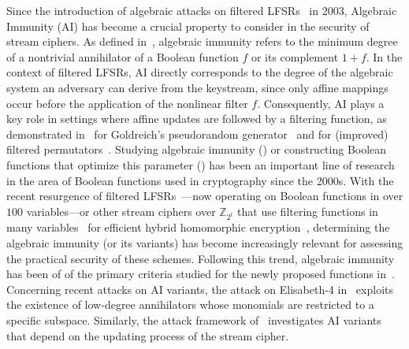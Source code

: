 \documentclass[11pt]{llncs}
\begin{document}
Since the introduction of algebraic attacks on filtered LFSRs~\cite{EC:CouMei03} in 2003, Algebraic Immunity (AI) has become a crucial property to consider in the security of stream ciphers. 
As defined in~\cite{EC:MeiPasCar04}, algebraic immunity refers to the minimum degree of a nontrivial annihilator of a Boolean function $f$ or its complement $1+f$. 
In the context of filtered LFSRs, AI directly corresponds to the degree of the algebraic system an adversary can derive from the keystream, since only affine mappings occur before the application of the nonlinear filter $f$. 
Consequently, AI plays a key role in settings where affine updates are followed by a filtering function, as demonstrated in~\cite{SIAM:AppLov18} for Goldreich's pseudorandom generator~\cite{Goldreich00} and for (improved) filtered permutators~\cite{EC:MJSC16,INDO:MCJS19}. 
Studying algebraic immunity (\eg \cite{IEEE:Didier06,AMC:CarMer13,DAM:Meaux22}) or constructing Boolean functions that optimize this parameter (\eg \cite{INDOCRYPT:DalGupMai04,DCC:DalMaiSar06,ISIT:Carlet07,LiQi07,AC:CarFen08,IEEE:QFLW09,IEEE:CheLu11,IEEE:ZCSH11,DCC:TuDen11,
AC:LiuZhaLin12,IEEE:TanCarTan13,CC:LimKolKal13,DCC:LCZLHS14,IEEE:LiuLin14,TanLuoDu16,IEEE:TCTZ17, DCC:LimKol18,CC:TangLiu19}) has been an important line of research in the area of Boolean functions used in cryptography since the 2000s. 
With the recent resurgence of filtered LFSRs~\cite{eprint:nostalgia,eprint:CarSar25}—now operating on Boolean functions in over $100$ variables—or other stream ciphers over $\mathbb{Z}_{2^t}$ that use filtering functions in many variables~\cite{AC:CHMS22,Indo:HofMeaSta23} for efficient hybrid homomorphic encryption~\cite{EPRINT:LauNaeVai11}, determining the algebraic immunity (or its variants) has become increasingly relevant for assessing the practical security of these schemes.
Following this trend, algebraic immunity has been of of the primary criteria studied for the newly proposed functions in~\cite{eprint:CarSar23,eprint:MeaSeuTan24,eprint:Meaux25}.
Concerning recent attacks on AI variants, the attack on Elisabeth-4 in~\cite{AC:GHJR23} exploits the existence of low-degree annihilators whose monomials are restricted to a specific subspace.
Similarly, the attack framework of~\cite{CIC:MeauxWang25} investigates AI variants that depend on the updating process of the stream cipher.

\end{document}

